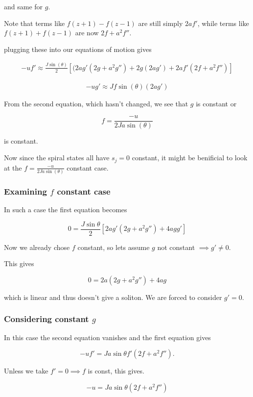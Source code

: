 \documentclass{article}
\begin{document}
and same for $g$.

Note that terms like $f(z+1) - f(z-1)$ are still simply $2af'$, while terms like
$f(z+1) + f(z-1)$ are now $2f + a^2f''$.

plugging these into our equations of motion gives

\begin{align*}
    -uf' \approx \frac{J\sin(\theta)}{2}[(2ag'(2g + a^2g'') + 2g(2ag') + 2af'(2f + a^2f'')]
\end{align*}

\begin{align*}
    -ug' \approx Jf\sin(\theta)(2ag')
\end{align*}

From the second equation, which hasn't changed, we see that $g$ is constant or 

\[
f = \frac{-u}{2Ja\sin(\theta)}
\]

is constant.

Now since the spiral states all have $s_j = 0$ constant, it might be benificial to look at the $f = \frac{-u}{2Ja\sin(\theta)}$ constant case.

\subsubsection{Examining $f$ constant case}

In such a case the first equation becomes 

\[
0 = \frac{J\sin\theta}{2}[2ag'(2g + a^2g'') + 4agg']
\]

Now we already chose $f$ constant, so lets assume $g$ not constant $\implies g' \neq 0$.

This gives

\[
0 = 2a(2g + a^2g'') + 4ag
\]

which is linear and thus doesn't give a soliton. We are forced to consider $g' = 0$.

\subsubsection{Considering constant $g$}

In this case the second equation vanishes and the first equation gives

\[
-uf' = Ja\sin\theta f'(2f + a^2f'').
\]

Unless we take $f' = 0 \implies f$ is const, this gives.

\[
-u = Ja\sin\theta (2f + a^2f'')
\]
\end{document}
